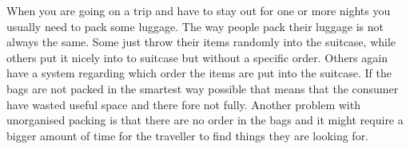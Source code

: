 When you are going on a trip and have to stay out for one or more nights you usually need to pack some luggage. The way people pack their luggage is not always the same. Some just throw their items randomly into the suitcase, while others put it nicely into to suitcase but without a specific order.
Others again have a system regarding which order the items are put into the suitcase. If the bags are not packed in the smartest way possible that means that the consumer have wasted useful space and there fore not fully.
Another problem with unorganised packing is that there are no order in the bags and it might require a bigger amount of time for the traveller to find things they are looking for.